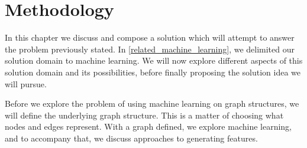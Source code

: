 \chapter{Methodology}\label{chap:analysis}

In this chapter we discuss and compose a solution which will attempt to answer the problem previously stated. In \cref{related_machine_learning}, we delimited our solution domain to machine learning. We will now explore different aspects of this solution domain and its possibilities, before finally proposing the solution idea we will pursue.

Before we explore the problem of using machine learning on graph structures, we will define the underlying graph structure. This is a matter of choosing what nodes and edges represent. With a graph defined, we explore machine learning, and to accompany that, we discuss approaches to generating features.








